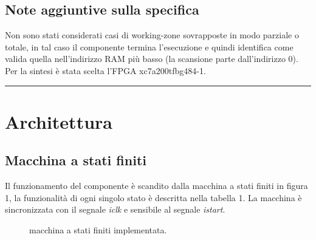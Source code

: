 \documentclass{article}
\begin{document}
\subsection{Note aggiuntive sulla specifica}
Non sono stati considerati casi di working-zone sovrapposte in modo parziale o totale, in tal caso il componente termina l'esecuzione e quindi identifica come valida quella nell'indirizzo RAM più basso (la scansione parte dall'indirizzo 0).
Per la sintesi è stata scelta l'FPGA xc7a200tfbg484-1.

\noindent\rule{\textwidth}{0.5pt}
\newpage
\section{Architettura}
\subsection{Macchina a stati finiti}
Il funzionamento del componente è scandito dalla macchina a stati finiti in figura 1, la funzionalità di ogni singolo stato è descritta nella tabella 1.
La macchina è sincronizzata con il segnale \textit{i\textunderscore clk} e sensibile al segnale \textit{i\textunderscore start}.
\begin{figure}[H]
\centering %
\caption{macchina a stati finiti implementata.}
\label{fig:my_label}
\end{figure}
\end{document}
